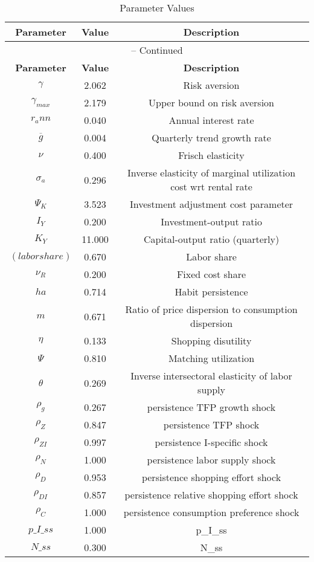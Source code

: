 \begin{center}
\begin{longtable}{ccc}
\caption{Parameter Values}\\%
\toprule%
\multicolumn{1}{c}{\textbf{Parameter}} &
\multicolumn{1}{c}{\textbf{Value}} &
 \multicolumn{1}{c}{\textbf{Description}}\\%
\midrule%
\endfirsthead
\multicolumn{3}{c}{{\tablename} \thetable{} -- Continued}\\%
\midrule%
\multicolumn{1}{c}{\textbf{Parameter}} &
\multicolumn{1}{c}{\textbf{Value}} &
  \multicolumn{1}{c}{\textbf{Description}}\\%
\midrule%
\endhead
${\gamma}$ 	 & 	 2.062 	 & 	 Risk aversion\\
${\gamma_{max}}$ 	 & 	 2.179 	 & 	 Upper bound on risk aversion\\
${r_ann}$ 	 & 	 0.040 	 & 	 Annual interest rate\\
${\overline{g}}$ 	 & 	 0.004 	 & 	 Quarterly trend growth rate\\
$\nu$ 	 & 	 0.400 	 & 	 Frisch elasticity\\
${\sigma_a}$ 	 & 	 0.296 	 & 	 Inverse elasticity of marginal utilization cost wrt rental rate\\
${\Psi_K}$ 	 & 	 3.523 	 & 	 Investment adjustment cost parameter\\
${I_Y}$ 	 & 	 0.200 	 & 	 Investment-output ratio\\
${K_Y}$ 	 & 	 11.000 	 & 	 Capital-output ratio (quarterly)\\
$(labor share)$ 	 & 	 0.670 	 & 	 Labor share\\
${\nu_R}$ 	 & 	 0.200 	 & 	 Fixed cost share\\
${ha}$ 	 & 	 0.714 	 & 	 Habit persistence\\
${m}$ 	 & 	 0.671 	 & 	 Ratio of price dispersion to consumption dispersion\\
${\eta}$ 	 & 	 0.133 	 & 	 Shopping disutility\\
${\Psi}$ 	 & 	 0.810 	 & 	 Matching utilization\\
${\theta}$ 	 & 	 0.269 	 & 	 Inverse intersectoral elasticity of labor supply\\
${\rho_g}$ 	 & 	 0.267 	 & 	 persistence TFP growth shock\\
${\rho_Z}$ 	 & 	 0.847 	 & 	 persistence TFP shock\\
${\rho_{ZI}}$ 	 & 	 0.997 	 & 	 persistence I-specific shock\\
${\rho_N}$ 	 & 	 1.000 	 & 	 persistence labor supply shock\\
${\rho_D}$ 	 & 	 0.953 	 & 	 persistence shopping effort shock\\
${\rho_{DI}}$ 	 & 	 0.857 	 & 	 persistence relative shopping effort shock\\
${\rho_C}$ 	 & 	 1.000 	 & 	 persistence consumption preference shock\\
$p\_I\_ss$ 	 & 	 1.000 	 & 	 p\_I\_ss\\
$N\_ss$ 	 & 	 0.300 	 & 	 N\_ss\\
\bottomrule%
\end{longtable}
\end{center}
